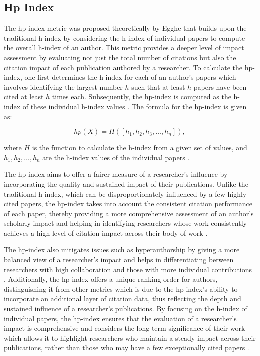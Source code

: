 \subsection{Hp Index}
The hp-index metric was proposed theoretically by Egghe \cite{egghe2011single}
that builds upon the traditional h-index by considering the h-index of
individual papers to compute the overall h-index of an author. This metric
provides a deeper level of impact assessment by evaluating not just the total
number of citations but also the citation impact of each publication authored
by a researcher. To calculate the hp-index, one first determines the h-index
for each of an author's papers which involves identifying the largest number
$h$ such that at least $h$ papers have been cited at least $h$ times each.
Subsequently, the hp-index is computed as the h-index of these individual
h-index values \cite{bihari2018h,singhal2023analysis,egghe2011single}. The
formula for the hp-index is given as:

\[
    hp(X) = H([h_1, h_2, h_3, \ldots, h_n]),
\]

where $H$ is the function to calculate the h-index from a given set of values,
and $h_1, h_2, \ldots, h_n$ are the h-index values of the individual papers
\cite{egghe2011single}.

The hp-index aims to offer a fairer measure of a researcher's influence by
incorporating the quality and sustained impact of their publications. Unlike
the traditional h-index, which can be disproportionately influenced by a few
highly cited papers, the hp-index takes into account the consistent citation
performance of each paper, thereby providing a more comprehensive assessment of
an author’s scholarly impact and helping in identifying researchers whose work
consistently achieves a high level of citation impact across their body of work
\cite{singhal2023hp,singhal2023analysis}.

The hp-index also mitigates issues such as hyperauthorship by giving a more
balanced view of a researcher's impact and helps in differentiating between
researchers with high collaboration and those with more individual
contributions \cite{singhal2023hp,singhal2023analysis}. Additionally, the
hp-index offers a unique ranking order for authors, distinguishing it from
other metrics which is due to the hp-index's ability to incorporate an
additional layer of citation data, thus reflecting the depth and sustained
influence of a researcher's publications. By focusing on the h-index of
individual papers, the hp-index ensures that the evaluation of a researcher’s
impact is comprehensive and considers the long-term significance of their work
which allows it to highlight researchers who maintain a steady impact across
their publications, rather than those who may have a few exceptionally cited
papers \cite{singhal2023hp,singhal2023analysis}.

